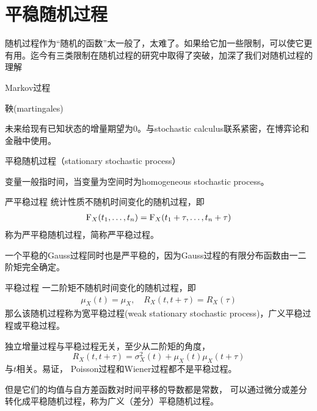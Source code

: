 \section{平稳随机过程}
随机过程作为“随机的函数”太一般了，太难了。如果给它加一些限制，可以使它更有用。迄今有三类限制在随机过程的研究中取得了突破，加深了我们对随机过程的理解
\begin{compactitem}
	\item Markov过程
	\item 鞅(martingales)
	
	未来给现有已知状态的增量期望为0。与stochastic calculus联系紧密，在博弈论和金融中使用。
	\item 平稳随机过程（stationary stochastic process）
	
	变量一般指时间，当变量为空间时为homogeneous stochastic process。
\end{compactitem}
\begin{definition}{严平稳过程}{}
	统计性质不随机时间变化的随机过程，即
	\begin{align*}
		\operatorname{F}_X(t_1,\ldots,t_n)=\operatorname{F}_X(t_1+\tau,\ldots,t_n+\tau)
	\end{align*}
	称为严平稳随机过程，简称严平稳过程。
\end{definition}
一个平稳的Gauss过程同时也是严平稳的，因为Gauss过程的有限分布函数由一二阶矩完全确定。
\begin{definition}{平稳过程}{}
	一二阶矩不随机时间变化的随机过程，即
	\begin{align}
		\mu_X(t)=\mu_X,\quad R_X(t,t+\tau)=R_X(\tau)
	\end{align}
	那么该随机过程称为宽平稳过程(weak stationary stochastic process)，广义平稳过程或平稳过程。
\end{definition}
独立增量过程与平稳过程无关，至少从二阶矩的角度，
\[
	R_X(t,t+\tau)=\sigma^2_X(t)+\mu_X(t)\mu_X(t+\tau)
\]
与$t$相关。易证，
Poisson过程和Wiener过程都不是平稳过程。

但是它们的均值与自方差函数对时间平移的导数都是常数，
可以通过微分或差分转化成平稳随机过程，称为广义（差分）平稳随机过程。
